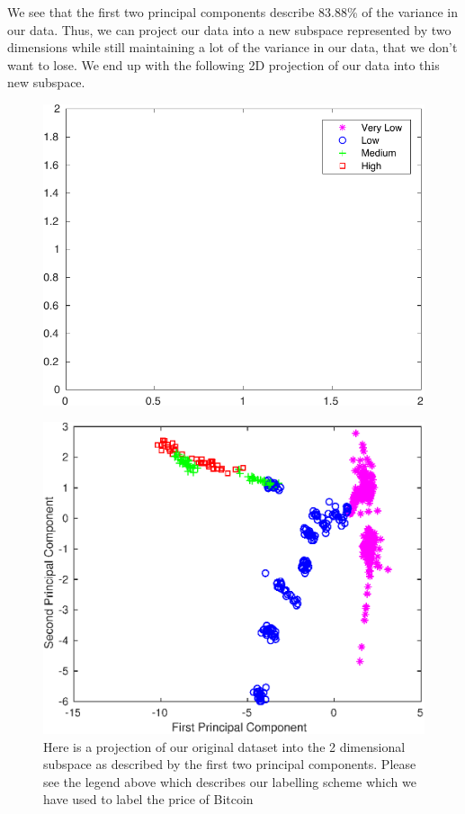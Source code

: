 \documentclass{article}
\begin{document}
We see that the first two principal components describe 83.88\% of the variance in our data. Thus, we can project our data into a new subspace represented by two dimensions while still maintaining a lot of the variance in our data, that we don't want to lose. We end up with the following 2D projection of our data into this new subspace.
\begin{figure}[H]
\centering
\includegraphics[scale = 0.7]{local/legend_2D_proj_copy.pdf}
\end{figure}
\begin{figure}[H]
\centering
\caption{Here is a projection of our original dataset into the 2 dimensional subspace as described by the first two principal components. Please see the legend above which describes our labelling scheme which we have used to label the price of Bitcoin}
\includegraphics{final/btc_2d_projection.eps}
\end{figure}
\end{document}
